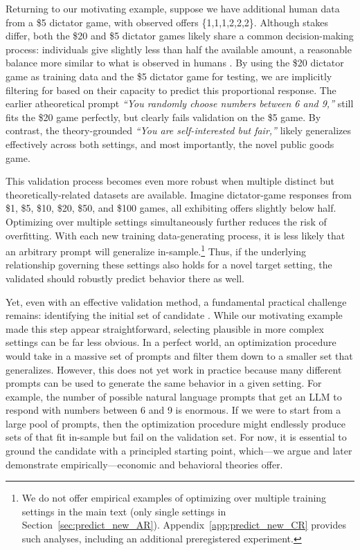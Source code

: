 Returning to our motivating example, suppose we have additional human data from a \$5 dictator game, with observed offers \{1,1,1,2,2,2\}.
Although stakes differ, both the \$20 and \$5 dictator games likely share a common decision-making process: individuals give slightly less than half the available amount, a reasonable balance more similar to what is observed in humans \citep{Henrich2001InSearch}.
By using the  \$20 dictator game as training data and the \$5 dictator game for testing, we are implicitly filtering for  based on their capacity to predict this proportional response.
The earlier atheoretical prompt \emph{``You randomly choose numbers between 6 and 9,''} still fits the \$20 game perfectly, but clearly fails validation on the \$5 game.
By contrast, the theory-grounded \persona{} \emph{``You are self-interested but fair,''} likely generalizes effectively across both settings, and most importantly, the novel public goods game.

This validation process becomes even more robust when multiple distinct but theoretically-related datasets are available. 
Imagine dictator-game responses from \$1, \$5, \$10, \$20, \$50, and \$100 games, all exhibiting offers slightly below half.
Optimizing over multiple settings simultaneously further reduces the risk of overfitting. 
With each new training data-generating process, it is less likely that an arbitrary prompt will generalize in-sample.\footnote{We do not offer empirical examples of optimizing over multiple training settings in the main text (only single settings in Section~\ref{sec:predict_new_AR}).
Appendix~\ref{app:predict_new_CR} provides such analyses, including an additional preregistered experiment.}
Thus, if the underlying relationship governing these settings also holds for a novel target setting, the validated  should robustly predict behavior there as well.

Yet, even with an effective validation method, a fundamental practical challenge remains: identifying the initial set of candidate . 
While our motivating example made this step appear straightforward, selecting plausible  in more complex settings can be far less obvious.
In a perfect world, an optimization procedure would take in a massive set of prompts and filter them down to a smaller set that generalizes.
However, this does not yet work in practice because many different prompts can be used to generate the same behavior in a given setting.
For example, the number of possible natural language prompts that get an LLM to respond with numbers between 6 and 9 is enormous.
If we were to start from a large pool of prompts, then the optimization procedure might endlessly produce sets of  that fit in-sample but fail on the validation set.
For now, it is essential to ground the candidate  with a principled starting point, which---we argue and later demonstrate empirically---economic and behavioral theories offer.
